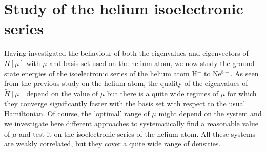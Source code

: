 \documentclass[aip,jcp,reprint,noshowkeys,superscriptaddress]{revtex4-1}
\begin{document}
\section{Study of the helium isoelectronic series}
Having investigated the behaviour of both the eigenvalues and eigenvectors of $\tilde{H}[\mu]$ with $\mu$ and basis set used on the helium atom, we now study the ground state energies of the isoelectronic series of the helium atom H$^{-}$ to Ne$^{8+}$. As seen from the previous study on the helium atom, the quality of the eigenvalues of $\tilde{H}[\mu]$ depend on the value of $\mu$ but there is a quite wide regimes of $\mu$ for which  they  converge significantly faster with the basis set with respect to the usual Hamiltonian. Of course, the 'optimal' range of $\mu$ might depend on the system and we investigate here different approaches to systematically find a reasonable value of $\mu$ and test it on the isoelectronic series of the helium atom. All these systems are weakly correlated, but they cover a quite wide range of densities. 
\end{document}
